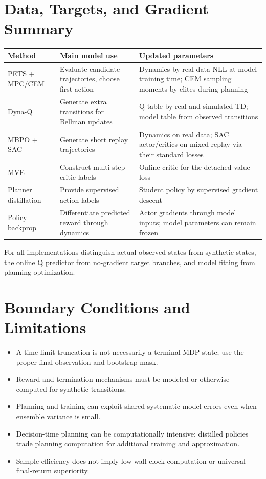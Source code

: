 \section{Data, Targets, and Gradient Summary}
\begin{center}\small
\begin{tabularx}{\textwidth}{@{}lXX@{}}\toprule
Method & Main model use & Updated parameters\\\midrule
PETS + MPC/CEM & Evaluate candidate trajectories, choose first action & Dynamics by real-data NLL at model training time; CEM sampling moments by elites during planning\\
Dyna-Q & Generate extra transitions for Bellman updates & Q table by real and simulated TD; model table from observed transitions\\
MBPO + SAC & Generate short replay trajectories & Dynamics on real data; SAC actor/critics on mixed replay via their standard losses\\
MVE & Construct multi-step critic labels & Online critic for the detached value loss\\
Planner distillation & Provide supervised action labels & Student policy by supervised gradient descent\\
Policy backprop & Differentiate predicted reward through dynamics & Actor gradients through model inputs; model parameters can remain frozen\\\bottomrule
\end{tabularx}
\end{center}
For all implementations distinguish actual observed states from synthetic states, the online Q predictor from no-gradient target branches, and model fitting from planning optimization.

\section{Boundary Conditions and Limitations}
\begin{itemize}
\item A time-limit truncation is not necessarily a terminal MDP state; use the proper final observation and bootstrap mask.
\item Reward and termination mechanisms must be modeled or otherwise computed for synthetic transitions.
\item Planning and training can exploit shared systematic model errors even when ensemble variance is small.
\item Decision-time planning can be computationally intensive; distilled policies trade planning computation for additional training and approximation.
\item Sample efficiency does not imply low wall-clock computation or universal final-return superiority.
\end{itemize}

